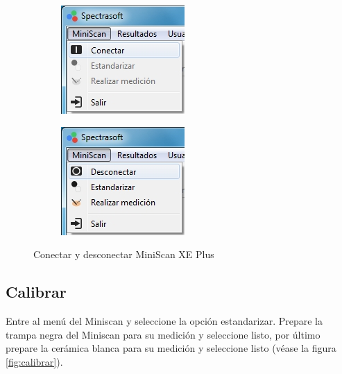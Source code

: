 \begin{figure}[H]
\centering
\begin{subfigure}{.5\textwidth}
  \centering
  \includegraphics[width=.6\linewidth]{./img/conectar.jpg}
\end{subfigure}%
\begin{subfigure}{.5\textwidth}
  \centering
  \includegraphics[width=.6\linewidth]{./img/desconectar.jpg}
\end{subfigure}
\caption[]{Conectar y desconectar MiniScan XE Plus\label{fig:conectar-desconectar}}
\end{figure}

	\subsection*{Calibrar}
		Entre al men\'{u} del Miniscan y seleccione la opci\'{o}n estandarizar. Prepare la trampa negra del Miniscan para su medici\'{o}n y seleccione listo, por \'{u}ltimo prepare la cer\'{a}mica blanca para su medici\'{o}n y seleccione listo (v\'{e}ase la figura \ref{fig:calibrar}).
	
